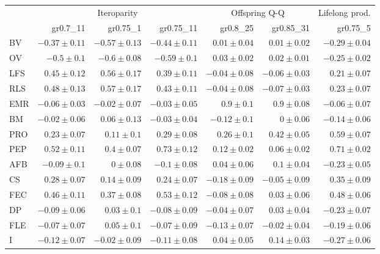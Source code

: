 \begin{landscape}
\begin{table}
\begin{footnotesize}
\begin{tabular}{@{}l|rrr|rr|r@{}}
\toprule
 & \multicolumn{3}{c|}{Iteroparity} & \multicolumn{2}{c|}{Offspring Q-Q} & \multicolumn{1}{c}{Lifelong prod.}\\
 & gr0.7\_11 & gr0.75\_1 & gr0.75\_11 & gr0.8\_25 & gr0.85\_31 & gr0.75\_5\\
\midrule
BV & $-0.37 \pm 0.11$ & $-0.57 \pm 0.13$ & $-0.44 \pm 0.11$ & $0.01 \pm 0.04$ & $0.01 \pm 0.02$ & $-0.29 \pm 0.04$\\
OV & $-0.5 \pm 0.1$ & $-0.6 \pm 0.08$ & $-0.59 \pm 0.1$ & $0.03 \pm 0.02$ & $0.02 \pm 0.01$ & $-0.25 \pm 0.02$\\
LFS & $0.45 \pm 0.12$ & $0.56 \pm 0.17$ & $0.39 \pm 0.11$ & $-0.04 \pm 0.08$ & $-0.06 \pm 0.03$ & $0.21 \pm 0.07$\\
RLS & $0.48 \pm 0.13$ & $0.57 \pm 0.17$ & $0.43 \pm 0.11$ & $-0.04 \pm 0.08$ & $-0.07 \pm 0.03$ & $0.23 \pm 0.07$\\
EMR & $-0.06 \pm 0.03$ & $-0.02 \pm 0.07$ & $-0.03 \pm 0.05$ & $0.9 \pm 0.1$ & $0.9 \pm 0.08$ & $-0.06 \pm 0.07$\\
BM & $-0.02 \pm 0.06$ & $0.06 \pm 0.13$ & $-0.03 \pm 0.04$ & $-0.12 \pm 0.1$ & $0 \pm 0.06$ & $-0.14 \pm 0.06$\\
PRO & $0.23 \pm 0.07$ & $0.11 \pm 0.1$ & $0.29 \pm 0.08$ & $0.26 \pm 0.1$ & $0.42 \pm 0.05$ & $0.59 \pm 0.07$\\
PEP & $0.52 \pm 0.11$ & $0.4 \pm 0.07$ & $0.73 \pm 0.12$ & $0.12 \pm 0.02$ & $0.06 \pm 0.02$ & $0.71 \pm 0.02$\\
AFB & $-0.09 \pm 0.1$ & $0 \pm 0.08$ & $-0.1 \pm 0.08$ & $0.04 \pm 0.06$ & $0.1 \pm 0.04$ & $-0.23 \pm 0.05$\\
CS & $0.28 \pm 0.07$ & $0.14 \pm 0.09$ & $0.24 \pm 0.07$ & $-0.18 \pm 0.09$ & $-0.05 \pm 0.09$ & $0.35 \pm 0.09$\\
FEC & $0.46 \pm 0.11$ & $0.37 \pm 0.08$ & $0.53 \pm 0.12$ & $-0.08 \pm 0.08$ & $0.03 \pm 0.06$ & $0.48 \pm 0.06$\\
DP & $-0.09 \pm 0.06$ & $0.03 \pm 0.1$ & $-0.08 \pm 0.09$ & $-0.04 \pm 0.07$ & $0.03 \pm 0.04$ & $-0.23 \pm 0.07$\\
FLE & $-0.07 \pm 0.07$ & $0.05 \pm 0.1$ & $-0.07 \pm 0.09$ & $-0.13 \pm 0.07$ & $-0.02 \pm 0.04$ & $-0.19 \pm 0.06$\\
I & $-0.12 \pm 0.07$ & $-0.02 \pm 0.09$ & $-0.11 \pm 0.08$ & $0.04 \pm 0.05$ & $0.14 \pm 0.03$ & $-0.27 \pm 0.06$\\
\bottomrule
\end{tabular}


\end{footnotesize}
\end{table}
\end{landscape}

